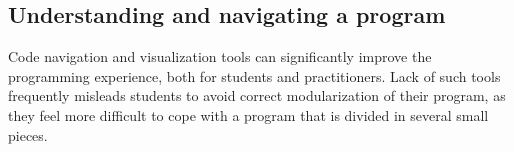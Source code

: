%
%
%



\subsection{Understanding and navigating a program}
Code navigation and visualization tools can significantly improve the programming experience, both for students and practitioners.
Lack of such tools frequently misleads students to avoid correct modularization of their program, 
as they feel more difficult to cope with a program that is divided in several small pieces.

